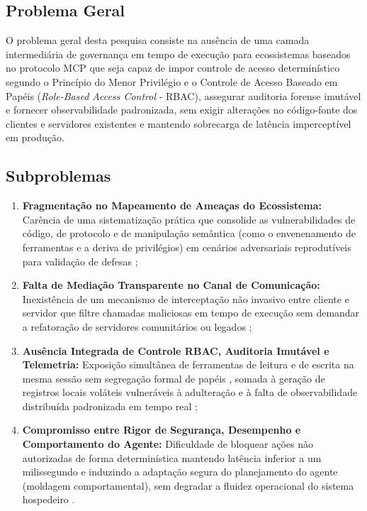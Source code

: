 \subsection{Problema Geral}
\label{subsec:problema_geral}

O problema geral desta pesquisa consiste na ausência de uma camada intermediária de governança em tempo de execução para ecossistemas baseados no protocolo MCP que seja capaz de impor controle de acesso determinístico segundo o Princípio do Menor Privilégio e o Controle de Acesso Baseado em Papéis (\textit{Role-Based Access Control} - RBAC), assegurar auditoria forense imutável e fornecer observabilidade padronizada, sem exigir alterações no código-fonte dos clientes e servidores existentes e mantendo sobrecarga de latência imperceptível em produção.

\subsection{Subproblemas}
\label{subsec:subproblemas}

\begin{enumerate}
  \item \textbf{Fragmentação no Mapeamento de Ameaças do Ecossistema:} Carência de uma sistematização prática que consolide as vulnerabilidades de código, de protocolo e de manipulação semântica (como o envenenamento de ferramentas e a deriva de privilégios) em cenários adversariais reprodutíveis para validação de defesas \cite{hasan2026mcp,hou2025mcp,jang2026hierarchical};

  \item \textbf{Falta de Mediação Transparente no Canal de Comunicação:} Inexistência de um mecanismo de interceptação não invasivo entre cliente e servidor que filtre chamadas maliciosas em tempo de execução sem demandar a refatoração de servidores comunitários ou legados \cite{singh2026mcpsecure,guo2025measurement};

  \item \textbf{Ausência Integrada de Controle RBAC, Auditoria Imutável e Telemetria:} Exposição simultânea de ferramentas de leitura e de escrita na mesma sessão sem segregação formal de papéis \cite{zhang2025acfix,singh2026mcpsecure}, somada à geração de registros locais voláteis vulneráveis à adulteração e à falta de observabilidade distribuída padronizada em tempo real \cite{jang2026hierarchical};

  \item \textbf{Compromisso entre Rigor de Segurança, Desempenho e Comportamento do Agente:} Dificuldade de bloquear ações não autorizadas de forma determinística mantendo latência inferior a um milissegundo e induzindo a adaptação segura do planejamento do agente (moldagem comportamental), sem degradar a fluidez operacional do sistema hospedeiro \cite{singh2026mcpsecure}.
\end{enumerate}


